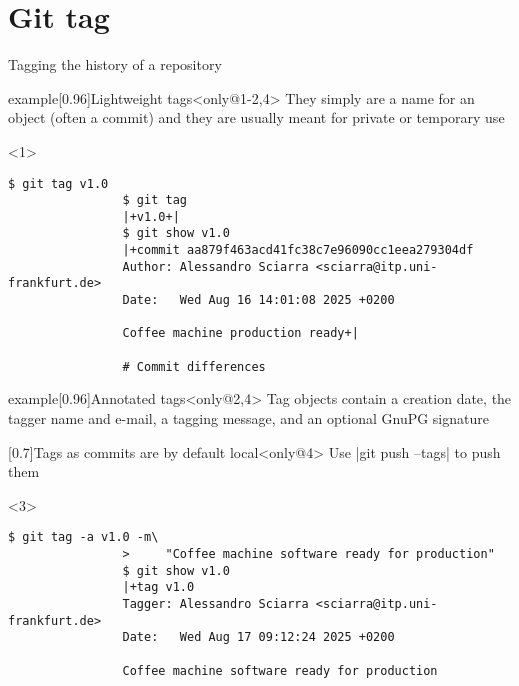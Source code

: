 \documentclass[usenames,svgnames,14pt]{beamer}
\begin{document}
\section{Git tag}
\begin{frame}[fragile]{Tagging the history of a repository}
    \vspace{-8mm}
    \begin{overlayarea}{\textwidth}{0.7\textheight}
        \begin{varblock}{example}[0.96\textwidth]{Lightweight tags}<only@1-2,4>
            They simply are a name for an object (often a commit) and they are usually meant for private or temporary use
        \end{varblock}
        \begin{onlyenv}<1>
            \begin{lstlisting}[style=MyBash]
                $ git tag v1.0
                $ git tag
                |+v1.0+|
                $ git show v1.0
                |+commit aa879f463acd41fc38c7e96090cc1eea279304df
                Author: Alessandro Sciarra <sciarra@itp.uni-frankfurt.de>
                Date:   Wed Aug 16 14:01:08 2025 +0200

                Coffee machine production ready+|

                # Commit differences
            \end{lstlisting}
        \end{onlyenv}
        \begin{varblock}{example}[0.96\textwidth]{Annotated tags}<only@2,4>
            Tag objects contain a creation date, the tagger name and e-mail, a tagging message, and an optional GnuPG signature
        \end{varblock}
        \begin{varblock}{}[0.7\textwidth]{Tags as commits are by default local}<only@4>
            Use \;\bash|git push --tags|\; to push them
        \end{varblock}
        \begin{onlyenv}<3>
            \begin{lstlisting}[style=MyBash, aboveskip=7mm]
                $ git tag -a v1.0 -m\
                >     "Coffee machine software ready for production"
                $ git show v1.0
                |+tag v1.0
                Tagger: Alessandro Sciarra <sciarra@itp.uni-frankfurt.de>
                Date:   Wed Aug 17 09:12:24 2025 +0200

                Coffee machine software ready for production


\end{lstlisting}
\end{onlyenv}
\end{overlayarea}
\end{frame}
\end{document}
